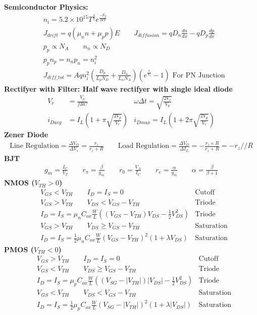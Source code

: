 \documentclass[12pt,letterpaper]{article} \usepackage{amsmath} \usepackage{graphicx} \usepackage[margin=1in]{geometry} \usepackage{longtable}  \usepackage{amssymb}
\begin{document}
\textbf{Semiconductor Physics:}
	\begin{align*}
&		n_i = 5.2\times 10^{15} T^{\frac{3}{2}} e^\frac{-E_g}{2kT}\\
&		J_{drift} = q(\mu_n n+ \mu_p p) E \qquad J_{diffusion} = qD_n \frac{dn}{dx} - qD_p \frac{dp}{dx}\\
&		p_p \propto N_A \qquad n_n \propto N_D\\
&		p_pn_p = n_np_n = n_i^2\\
& 		J_{diff\_tot} = Aqn_i^2\left(\frac{D_p}{L_pN_D}+\frac{D_n}{L_nN_A}\right)\left(e^{\frac{v}{V_t}}-1\right) \text{ For PN Junction}
	\end{align*}
\textbf{Rectifyer with Filter: Half wave rectifyer with single ideal diode}
	\begin{align*}
		V_r &= \frac{V_p}{fRC} &\omega\Delta t = \sqrt{\frac{2V_r}{V_p}} \\
		i_{Davg} &= I_L(1+\pi\sqrt{\frac{2V_p}{V_r}}) &i_{Dmax} = I_L(1+2\pi\sqrt{\frac{2V_p}{V_r}}) 
	\end{align*}
\textbf{Zener Diode}
	\begin{align*}
		\text{Line Regulation}=\frac{\Delta V_O}{\Delta V_s} = \frac{r_z}{r_z+R} \qquad \text{Load Regulation}=\frac{\Delta V_O}{\Delta I_L} = -\frac{r_z\times R}{r_z+R} = -r_z // R
	\end{align*}
	\textbf{BJT}
	\begin{align*}
		g_m = \frac{I_C}{V_T} \qquad r_\pi = \frac{\beta}{g_m} \qquad r_0 = \frac{V_A}{I_C} \qquad r_e = \frac{\alpha}{g_m} \qquad \alpha = \frac{\beta}{\beta+1}
	\end{align*}
\textbf{NMOS ($V_{TH}>0$)}
	\begin{align*}
		&V_{GS} < V_{TH} \qquad I_D = I_S = 0 &\text{Cutoff}\\
		&V_{GS} > V_{TH} \qquad V_{DS} < V_{GS} - V_{TH} &\text{Triode}\\
		&I_D = I_S = \mu_n C_{ox} \frac{W}{L} \left((V_{GS}-V_{TH})V_{DS} - \frac{1}{2}V^2_{DS}\right)&\text{Triode}\\
		&V_{GS} > V_{TH} \qquad V_{DS} \ge V_{GS} - V_{TH}&\text{Saturation}\\
		&I_D = I_S = \frac{1}{2}\mu_n C_{ox} \frac{W}{L} (V_{GS} - V_{TH})^2(1+\lambda V_{DS})&\text{Saturation}
	\end{align*}
\textbf{PMOS ($V_{TH}<0$)}
	\begin{align*}
		&V_{GS} > V_{TH} \qquad I_D = I_S = 0 &\text{Cutoff}\\
		&V_{GS} < V_{TH} \qquad V_{DS} \ge V_{GS} - V_{TH} &\text{Triode}\\
		&I_D = I_S = \mu_p C_{ox} \frac{W}{L} \left((V_{SG}-|V_{TH}|)|V_{DS}| - \frac{1}{2}V^2_{DS}\right)&\text{Triode}\\
		&V_{GS} < V_{TH} \qquad V_{DS} < V_{GS} - V_{TH}&\text{Saturation}\\
		&I_D = I_S = \frac{1}{2}\mu_p C_{ox} \frac{W}{L} (V_{SG} - |V_{TH}|)^2(1+\lambda |V_{DS}|)&\text{Saturation}
	\end{align*}
\end{document}
